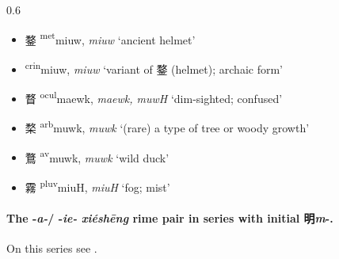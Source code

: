\begin{itemize}
\begin{spacing}{0.6}
\begin{itemize}
  \item {\Large{鍪}} %
    {\large{{\textsuperscript{met}}miuw}},
    \textit{miuw} `ancient helmet' %

  \item {\Large{}} %
    {\large{{\textsuperscript{crin}}miuw}},
    \textit{miuw} `variant of 鍪 (helmet); archaic form' %

  \item {\Large{瞀}} %
    {\large{{\textsuperscript{ocul}}maewk}},
    \textit{maewk, muwH} `dim-sighted; confused' %

  \item {\Large{楘}} %
    {\large{{\textsuperscript{arb}}muwk}},
    \textit{muwk} `(rare) a type of tree or woody growth' %

  \item {\Large{鶩}} %
    {\large{{\textsuperscript{av}}muwk}},
    \textit{muwk} `wild duck' %

  \item {\Large{霧}} %
    {\large{{\textsuperscript{pluv}}miuH}},
    \textit{miuH} `fog; mist' %

\end{itemize}


\end{spacing}
\end{itemize}


\paragraph{The -\textit{a-}/ -\textit{ie-} \textit{xiéshēng} rime pair in series with initial 明\textit{m}-.}

On this series see \citep[269-270]{Baxter2014OldChinese}. 



